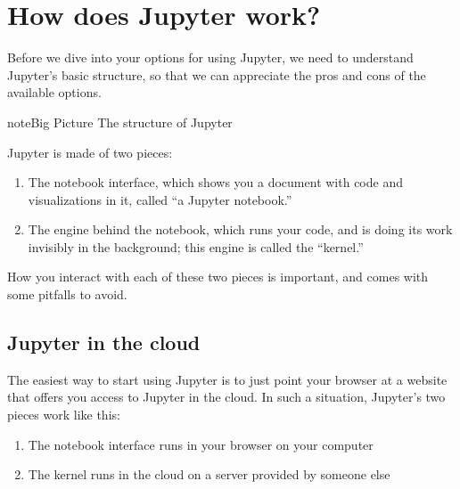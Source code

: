 \documentclass[letterpaper,10pt,english]{jupyterBook}
\begin{document}
\section{How does Jupyter work?}
\label{\detokenize{chapter-3-jupyter:how-does-jupyter-work}}
\sphinxAtStartPar
Before we dive into your options for using Jupyter, we need to understand Jupyter’s basic structure, so that we can appreciate the pros and cons of the available options.

\begin{sphinxadmonition}{note}{Big Picture \sphinxhyphen{} The structure of Jupyter}

\sphinxAtStartPar
Jupyter is made of two pieces:
\begin{enumerate}
%
\item {} 
\sphinxAtStartPar
The notebook interface, which shows you a document with code and visualizations in it, called “a Jupyter notebook.”

\item {} 
\sphinxAtStartPar
The engine behind the notebook, which runs your code, and is doing its work invisibly in the background; this engine is called the “kernel.”

\end{enumerate}

\sphinxAtStartPar
How you interact with each of these two pieces is important, and comes with some pitfalls to avoid.
\end{sphinxadmonition}


\subsection{Jupyter in the cloud}
\label{\detokenize{chapter-3-jupyter:jupyter-in-the-cloud}}
\sphinxAtStartPar
The easiest way to start using Jupyter is to just point your browser at a website that offers you access to Jupyter in the cloud.  In such a situation, Jupyter’s two pieces work like this:
\begin{enumerate}
%
\item {} 
\sphinxAtStartPar
The notebook interface runs in your browser on your computer

\item {} 
\sphinxAtStartPar
The kernel runs in the cloud on a server provided by someone else

\end{enumerate}
\end{document}
